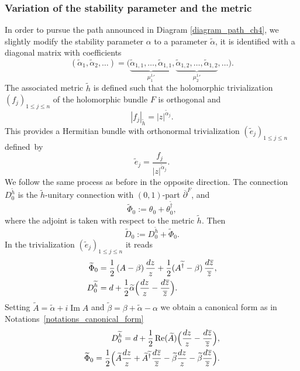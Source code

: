 \documentclass[JEP,XML,SOM,NoEqCountersInSection,Unicode,published]{cedram}
\theoremstyle{definition}
\theoremstyle{plain}
\DeclareMathOperator{\Imm}{Im}
\DeclareMathOperator{\Ree}{Re}
\begin{document}
\subsubsection{Variation of the stability parameter and the metric}\label{subsect_local_variation_metric}
In order to pursue the path announced in Diagram \eqref{diagram_path_ch4}, we slightly modify the stability parameter $\alpha$ to a parameter $\widetilde{\alpha}$, it is identified with a diagonal matrix with coefficients
\[
(\widetilde{\alpha}_1,\widetilde{\alpha}_2,\dots)=\bigl(\underbrace{\widetilde{\alpha}_{1,1},\dots, \widetilde{\alpha}_{1,1}}_{{\mu^1_1}' }, \underbrace{\widetilde{\alpha}_{1,2},\dots, \widetilde{\alpha}_{1,2}}_{ {\mu^1_2}'}, \dots \bigr).
\]
The associated metric $\widetilde{h}$ is defined such that the holomorphic trivialization $(f_j)_{1\le j\le n}$ of the holomorphic bundle $F$ is orthogonal and
\[
|f_j|_{\widetilde{h}} =|z|^{\widetilde{\alpha}_j}.
\]
This provides a Hermitian bundle with orthonormal trivialization $(\widetilde{e}_j)_{1\le j\le n}$ defined~by
\[
\widetilde{e}_j = \frac{f_j}{|z|^{\widetilde{\alpha}_j}}.
\]
We follow the same process as before in the opposite direction. The connection $D_0^{\widetilde{h}}$ is the $\widetilde{h}$-unitary connection with $(0,1)$-part $\overline{\partial}^F$, and
\[
\widetilde{\Phi}_0 := \theta_0 + \theta_0^{\widetilde{\dagger}},
\]
where the adjoint is taken with respect to the metric $\widetilde{h}$. Then
\[
\widetilde{D}_0 := D_0^{\widetilde{h}} + \widetilde{\Phi}_0.
\]
In the trivialization $(\widetilde{e}_j)_{1\le j\le n}$ it reads
\begin{align*}
\widetilde{\Phi}_0 &= \frac{1}{2}\left(A-\beta\right)\frac{d z}{z} + \frac{1}{2}(A^{\widetilde{\dagger}}-\beta)\,\frac{d \overline{z}}{\overline{z}}, \\
D_0^{\widetilde{h}} &= d + \frac{1}{2}\widetilde{\alpha} \Bigl(\frac{d z}{z}-\frac{d\overline{z}}{\overline{z}}\Bigr).
\end{align*}
Setting $\widetilde{A}= \widetilde{\alpha}+i \Imm A$ and $\widetilde{\beta}= \beta + \widetilde{\alpha} - \alpha$ we obtain a canonical form as in Notations~\ref{notations_canonical_form}
\begin{align*}
D_0^{\widetilde{h}}= d + \frac{1}{2}\Ree(\widetilde{A})\Bigl(\frac{d z}{z}-\frac{d \overline{z}}{\overline{z}}\Bigr), \\
\widetilde{\Phi}_0 = \frac{1}{2}\Bigl(\widetilde{A}\frac{d z}{z} + \widetilde{A}^{\widetilde{\dagger}}\frac{d\overline{z}}{\overline{z}} - \widetilde{\beta} \frac{d z}{z} - \widetilde{\beta} \frac{d \overline{z}}{\overline{z}}\Bigr).
\end{align*}
\end{document}
